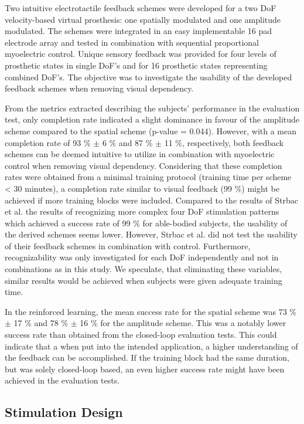 Two intuitive electrotactile feedback schemes were developed for a two DoF velocity-based virtual prosthesis: one spatially modulated and one amplitude modulated. The schemes were integrated in an easy implementable 16 pad electrode array and tested in combination with sequential proportional myoelectric control. Unique sensory feedback was provided for four levels of prosthetic states in single DoF's and for 16 prosthetic states representing combined DoF's. The objective was to investigate the usability of the developed feedback schemes when removing visual dependency.

From the metrics extracted describing the subjects' performance in the evaluation test, only completion rate indicated a slight  dominance in favour of the amplitude scheme compared to the spatial scheme (p-value = 0.044). However, with a mean completion rate of 93 \% $\pm$ 6 \% and 87 \% $\pm$ 11 \%, respectively, both feedback schemes can be deemed intuitive to utilize in combination with myoelectric control when removing visual dependency. Considering that these completion rates were obtained from a minimal training protocol (training time per scheme < 30 minutes), a completion rate similar to visual feedback (99 \%) might be achieved if more training blocks were included.
Compared to the results of Strbac et al. \cite{Strbac2016} the results of recognizing more complex four DoF stimulation patterns which achieved a success rate of 99 $\%$ for able-bodied subjects, the usability of the derived schemes seems lower. However, Strbac et al. did not test the usability of their feedback schemes in combination with control. Furthermore, recognizability was only investigated for each DoF independently and not in combinations as in this study. We speculate, that eliminating these variables, similar results would be achieved when subjects were given adequate training time.       

In the reinforced learning, the mean success rate for the spatial scheme was 73 \%  $\pm$ 17 \% and 78 \%  $\pm$ 16 \% for the amplitude scheme. This was a notably lower success rate than obtained from the closed-loop evaluation tests. This could indicate that a when put into the intended application, a higher understanding of the feedback can be accomplished. If the training block had the same duration, but was solely closed-loop based, an even higher success rate might have been achieved in the evaluation tests. 

\subsection{Stimulation Design}

